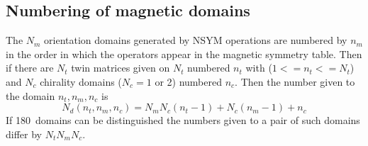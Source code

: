 \subsection{Numbering of magnetic domains}\label{magdoms}
The $N_m$ orientation domains generated by NSYM operations are numbered 
by $n_m$ in the order in which the operators appear in the magnetic symmetry table. Then 
if there are $N_t$ twin matrices given on $N_t$  numbered $n_t$ with
 ($1 <=n_t<=N_t$) and $N_c$ chirality domains ($N_c= 1$ or 2) numbered $n_c$. Then
 the number given to the domain $n_t,n_m,n_c$ is 
 \[N_d(n_t,n_m,n_c)=N_mN_c(n_t-1) + N_c(n_m-1)+n_c
\]
 If 180\degrees\ domains can be distinguished the numbers given to a pair of such domains 
 differ by $N_tN_mN_c$.

\finchapter
%
